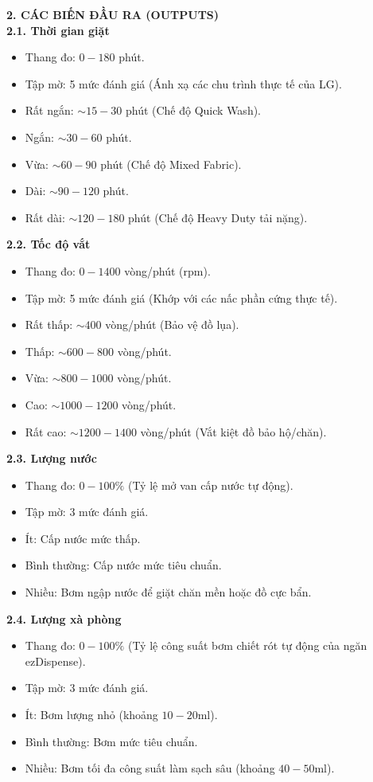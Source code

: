 \documentclass[12pt, a4paper]{article}
\begin{document}
\textbf{2. CÁC BIẾN ĐẦU RA (OUTPUTS)}\\
\textbf{2.1. Thời gian giặt}
\begin{itemize}
    \item Thang đo: $0 - 180$ phút.
    \item Tập mờ: 5 mức đánh giá (Ánh xạ các chu trình thực tế của LG).
    \item Rất ngắn: $\sim 15 - 30$ phút (Chế độ Quick Wash).
    \item Ngắn: $\sim 30 - 60$ phút.
    \item Vừa: $\sim 60 - 90$ phút (Chế độ Mixed Fabric).
    \item Dài: $\sim 90 - 120$ phút.
    \item Rất dài: $\sim 120 - 180$ phút (Chế độ Heavy Duty tải nặng).
\end{itemize}
\textbf{2.2. Tốc độ vắt}
\begin{itemize}
    \item Thang đo: $0 - 1400$ vòng/phút (rpm).
    \item Tập mờ: 5 mức đánh giá (Khớp với các nấc phần cứng thực tế).
    \item Rất thấp: $\sim 400$ vòng/phút (Bảo vệ đồ lụa).
    \item Thấp: $\sim 600 - 800$ vòng/phút.
    \item Vừa: $\sim 800 - 1000$ vòng/phút.
    \item Cao: $\sim 1000 - 1200$ vòng/phút.
    \item Rất cao: $\sim 1200 - 1400$ vòng/phút (Vắt kiệt đồ bảo hộ/chăn).
\end{itemize}
\textbf{2.3. Lượng nước}
\begin{itemize}
    \item Thang đo: $0 - 100\%$ (Tỷ lệ mở van cấp nước tự động).
    \item Tập mờ: 3 mức đánh giá.
    \item Ít: Cấp nước mức thấp.
    \item Bình thường: Cấp nước mức tiêu chuẩn.
    \item Nhiều: Bơm ngập nước để giặt chăn mền hoặc đồ cực bẩn.
\end{itemize}
\textbf{2.4. Lượng xà phòng}
\begin{itemize}
    \item Thang đo: $0 - 100\%$ (Tỷ lệ công suất bơm chiết rót tự động của ngăn ezDispense).
    \item Tập mờ: 3 mức đánh giá.
    \item Ít: Bơm lượng nhỏ (khoảng $10-20$ml).
    \item Bình thường: Bơm mức tiêu chuẩn.
    \item Nhiều: Bơm tối đa công suất làm sạch sâu (khoảng $40-50$ml).
\end{itemize}
\end{document}
